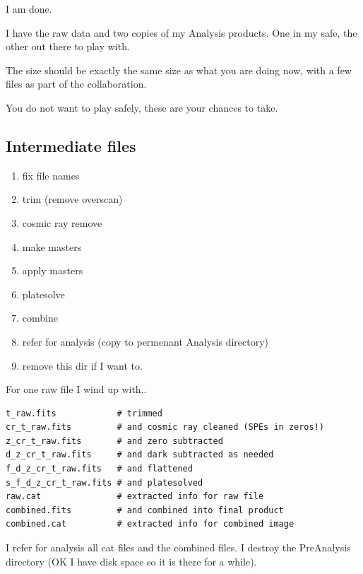 \documentclass[letter,11pt,oneside]{article}
\begin{document}
I am done.

I have the raw data and two copies of my Analysis products.
One in my safe, the other out there to play with.

The size should be exactly the same size as what you are doing
now, with a few files as part of the collaboration.

You do not want to play safely, these are your chances to take.


\subsection{Intermediate files}

\vspace{-.15cm}
\begin{enumerate}\addtolength{\itemsep}{-0.5\baselineskip}
   \item   fix file names
   \item   trim (remove overscan)
   \item   cosmic ray remove
   \item   make masters
   \item   apply masters
   \item   platesolve
   \item   combine
   \item   refer for analysis (copy to permenant Analysis directory)
   \item   remove this dir if I want to.
\end{enumerate}

For one raw file I wind up with..

\begingroup \fontsize{10pt}{10pt}
\selectfont
\begin{verbatim} 
t_raw.fits            # trimmed
cr_t_raw.fits         # and cosmic ray cleaned (SPEs in zeros!)
z_cr_t_raw.fits       # and zero subtracted
d_z_cr_t_raw.fits     # and dark subtracted as needed
f_d_z_cr_t_raw.fits   # and flattened
s_f_d_z_cr_t_raw.fits # and platesolved
raw.cat               # extracted info for raw file
combined.fits         # and combined into final product
combined.cat          # extracted info for combined image
\end{verbatim}
\endgroup

I refer for analysis all cat files and the combined files.
I destroy the PreAnalysis directory (OK I have disk space
so it is there for a while). 
\end{document}
